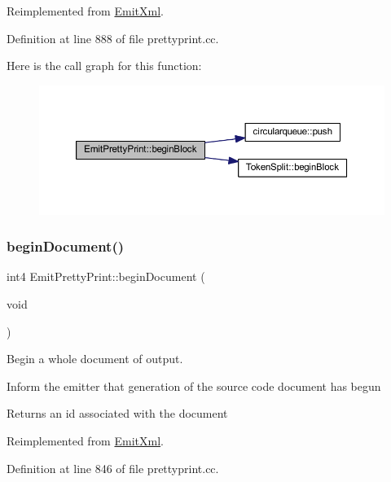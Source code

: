 Reimplemented from \mbox{\hyperlink{class_emit_xml_ad6cc09d4dfde00428eae8d556cd0fe72}{Emit\+Xml}}.



Definition at line 888 of file prettyprint.\+cc.

Here is the call graph for this function\+:
\nopagebreak
\begin{figure}[H]
\begin{center}
\leavevmode
\includegraphics[width=350pt]{class_emit_pretty_print_a751c7bb68c0557dc40cc2b1a2cb5a85f_cgraph}
\end{center}
\end{figure}
\mbox{\label{class_emit_pretty_print_a7d26817d23a381a55e78d4c7caf225f1}} 
\subsubsection{\texorpdfstring{beginDocument()}{beginDocument()}}
{\footnotesize\ttfamily int4 Emit\+Pretty\+Print\+::begin\+Document (\begin{DoxyParamCaption}\item[{void}]{ }\end{DoxyParamCaption})\hspace{0.3cm}{\ttfamily [virtual]}}



Begin a whole document of output. 

Inform the emitter that generation of the source code document has begun \begin{DoxyReturn}{Returns}
an id associated with the document 
\end{DoxyReturn}


Reimplemented from \mbox{\hyperlink{class_emit_xml_a9a4891144e0743f2b10faa32e6d34181}{Emit\+Xml}}.



Definition at line 846 of file prettyprint.\+cc.

